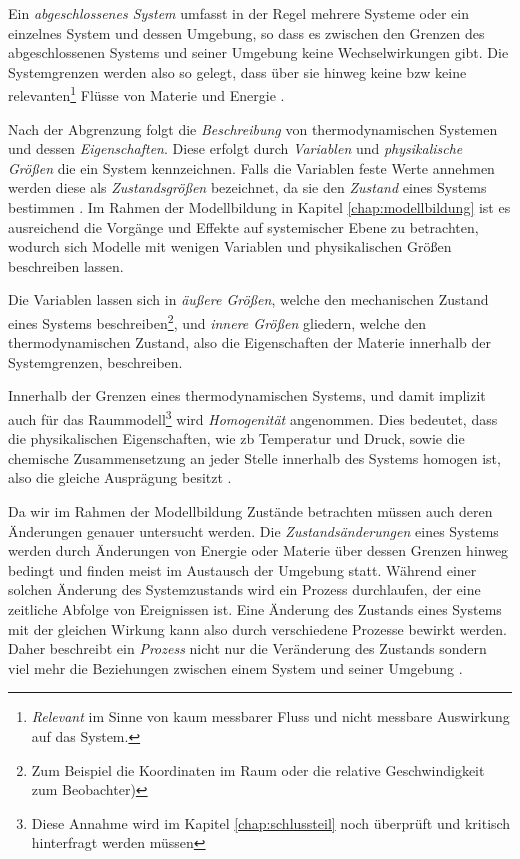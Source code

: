 Ein \textit{abgeschlossenes System} umfasst in der Regel mehrere Systeme oder ein einzelnes System und dessen Umgebung, so dass es zwischen den Grenzen des abgeschlossenen Systems und seiner Umgebung keine Wechselwirkungen gibt. Die Systemgrenzen werden also so gelegt, dass über sie hinweg keine \acrlong{bzw} keine relevanten\footnote{\textit{Relevant} im Sinne von kaum messbarer Fluss und nicht messbare Auswirkung auf das System.} Flüsse von Materie und Energie \cite[S.~13]{ba12}.

Nach der Abgrenzung folgt die \textit{Beschreibung} von thermodynamischen Systemen und dessen \textit{Eigenschaften}. Diese erfolgt durch \textit{Variablen} und \textit{physikalische Größen} die ein System kennzeichnen. Falls die Variablen feste Werte annehmen werden diese als \textit{Zustandsgrößen} bezeichnet, da sie den \textit{Zustand} eines Systems bestimmen \cite[S.~13]{ba12}. Im Rahmen der Modellbildung in Kapitel \ref{chap:modellbildung} ist es ausreichend die Vorgänge und Effekte auf systemischer Ebene zu betrachten, wodurch sich Modelle mit wenigen Variablen und physikalischen Größen beschreiben lassen.

Die Variablen lassen sich in \textit{äußere Größen}, welche den mechanischen Zustand eines Systems beschreiben\footnote{Zum Beispiel die Koordinaten im Raum oder die relative Geschwindigkeit zum Beobachter)}, und \textit{innere Größen} gliedern, welche den thermodynamischen Zustand, also die Eigenschaften der Materie innerhalb der Systemgrenzen, beschreiben\cite[S.13~f.]{ba12}.

Innerhalb der Grenzen eines thermodynamischen Systems, und damit implizit auch für das Raummodell\footnote{Diese Annahme wird im Kapitel \ref{chap:schlussteil} noch überprüft und kritisch hinterfragt werden müssen} wird \textit{Homogenität} angenommen. Dies bedeutet, dass die physikalischen Eigenschaften, wie \acrlong{zb} Temperatur und Druck, sowie die chemische Zusammensetzung an jeder Stelle innerhalb des Systems homogen ist, also die gleiche Ausprägung besitzt \cite[S.15]{ba12}.

Da wir im Rahmen der Modellbildung Zustände betrachten müssen auch deren Änderungen genauer untersucht werden. Die \textit{Zustandsänderungen} eines Systems werden durch Änderungen von Energie oder Materie über dessen Grenzen hinweg bedingt und finden meist im Austausch der Umgebung statt. Während einer solchen Änderung des Systemzustands wird ein Prozess durchlaufen, der eine zeitliche Abfolge von Ereignissen ist. Eine Änderung des Zustands eines Systems mit der gleichen Wirkung kann also durch verschiedene Prozesse bewirkt werden. Daher beschreibt ein \textit{Prozess} nicht nur die Veränderung des Zustands sondern viel mehr die Beziehungen zwischen einem System und seiner Umgebung \cite[S.21~f.]{ba12}.

